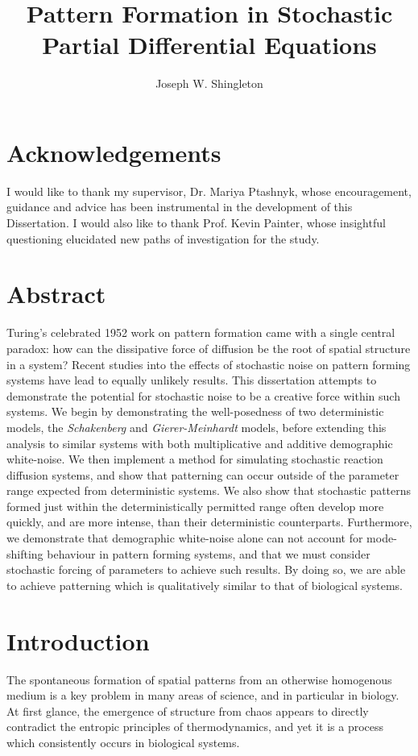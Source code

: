\documentclass[12pt]{article}
\title{Pattern Formation in Stochastic Partial Differential Equations}
\author{Joseph W. Shingleton }
\begin{document}

\maketitle
\newpage
\section*{Acknowledgements}
I would like to thank my supervisor, Dr. Mariya Ptashnyk, whose encouragement, guidance and advice has been instrumental in the development of this Dissertation. I would also like to thank Prof. Kevin Painter, whose insightful questioning elucidated new paths of investigation for the study.  
\newpage
\section*{Abstract}
Turing's celebrated 1952 work on pattern formation came with a single central paradox: how can the dissipative force of diffusion be the root of spatial structure in a system? Recent studies into the effects of stochastic noise on pattern forming systems have lead to equally unlikely results. This dissertation attempts to demonstrate the potential for stochastic noise to be a creative force within such systems. We begin by demonstrating the well-posedness of two deterministic models, the \textit{Schakenberg} and \textit{Gierer-Meinhardt} models, before extending this analysis to similar systems with both multiplicative and additive demographic white-noise. We then implement a method for simulating stochastic reaction diffusion systems, and show that patterning can occur outside of the parameter range expected from deterministic systems. We also show that stochastic patterns formed just within the deterministically permitted range often develop more quickly, and are more intense, than their deterministic counterparts. Furthermore, we demonstrate that demographic white-noise alone can not account for mode-shifting behaviour in pattern forming systems, and that we must consider stochastic forcing of parameters to achieve such results. By doing so, we are able to achieve patterning which is qualitatively similar to that of biological systems.  
\newpage
\tableofcontents
\newpage
\section{Introduction}
The spontaneous formation of spatial patterns from an otherwise homogenous medium is a key problem in many areas of science, and in particular in biology. At first glance, the emergence of structure from chaos appears to directly contradict the entropic principles of thermodynamics, and yet it is a process which consistently occurs in biological systems. 
\end{document}
